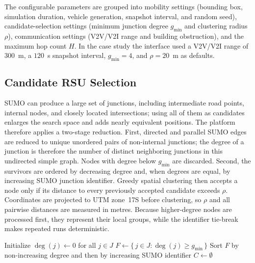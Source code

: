 \documentclass[engproc,proceedingpaper,submit,oneauthor]{Definitions/mdpi}
\begin{document}
The configurable parameters are grouped into mobility settings (bounding box,
simulation duration, vehicle generation, snapshot interval, and random seed),
candidate-selection settings (minimum junction degree $g_{\min}$ and clustering radius
$\rho$), communication settings (V2V/V2I range and building obstruction), and the
maximum hop count $H$. In the case study the interface used a V2V/V2I range of
$300$~m, a $120$~s snapshot interval, $g_{\min}=4$, and $\rho=20$~m as defaults.

\subsection{Candidate RSU Selection}
SUMO can produce a large set of junctions, including intermediate road points,
internal nodes, and closely located intersections; using all of them as candidates
enlarges the search space and adds nearly equivalent positions. The platform therefore
applies a two-stage reduction. First, directed and parallel SUMO edges are reduced to
unique unordered pairs of non-internal junctions; the degree of a junction is therefore
the number of distinct neighboring junctions in this undirected simple graph. Nodes
with degree below $g_{\min}$ are discarded. Second, the survivors are ordered by
decreasing degree and, when degrees are equal, by increasing SUMO junction identifier.
Greedy spatial clustering then accepts a node only if its distance to every previously
accepted candidate exceeds $\rho$. Coordinates are projected to UTM zone~17S before
clustering, so $\rho$ and all pairwise distances are measured in metres. Because
higher-degree nodes are processed first, they represent their local groups, while the
identifier tie-break makes repeated runs deterministic.

\begin{algorithm}[H]
\caption{Candidate RSU filtering by degree and greedy spatial clustering}
\label{alg:candidates}
Initialize $\deg(j)\leftarrow 0$ for all $j\in J$\;
$F\leftarrow\{\,j\in J:\deg(j)\ge g_{\min}\,\}$\;
Sort $F$ by non-increasing degree and then by increasing SUMO identifier\;
$C\leftarrow\emptyset$\;
\;
\end{algorithm}
\end{document}
